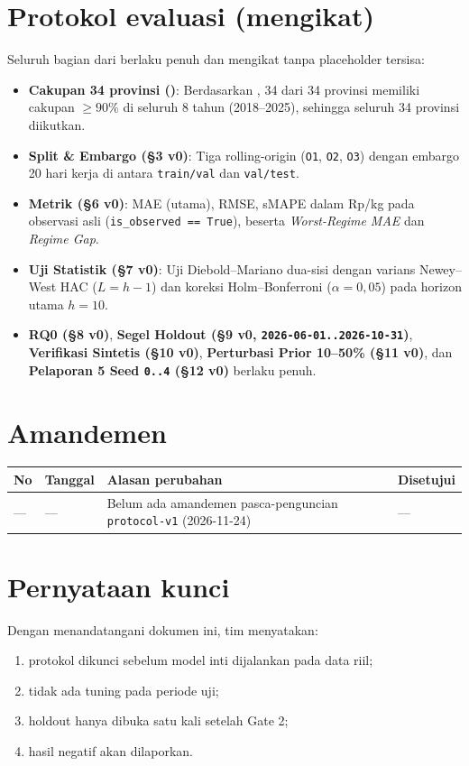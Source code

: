 \documentclass[11pt,a4paper]{article}
\begin{document}
\section{Protokol evaluasi (mengikat)}
Seluruh bagian dari  berlaku penuh dan mengikat tanpa placeholder tersisa:
\begin{itemize}
  \item \textbf{Cakupan 34 provinsi ()}: Berdasarkan , 34 dari 34 provinsi memiliki cakupan $\ge 90\%$ di seluruh 8 tahun (2018--2025), sehingga seluruh 34 provinsi diikutkan.
  \item \textbf{Split \& Embargo (\S3 v0)}: Tiga rolling-origin (\texttt{O1}, \texttt{O2}, \texttt{O3}) dengan embargo 20 hari kerja di antara \texttt{train/val} dan \texttt{val/test}.
  \item \textbf{Metrik (\S6 v0)}: MAE (utama), RMSE, sMAPE dalam Rp/kg pada observasi asli (\texttt{is\_observed == True}), beserta \emph{Worst-Regime MAE} dan \emph{Regime Gap}.
  \item \textbf{Uji Statistik (\S7 v0)}: Uji Diebold--Mariano dua-sisi dengan varians Newey--West HAC ($L = h - 1$) dan koreksi Holm--Bonferroni ($\alpha = 0{,}05$) pada horizon utama $h = 10$.
  \item \textbf{RQ0 (\S8 v0)}, \textbf{Segel Holdout (\S9 v0, \texttt{2026-06-01..2026-10-31})}, \textbf{Verifikasi Sintetis (\S10 v0)}, \textbf{Perturbasi Prior 10--50\% (\S11 v0)}, dan \textbf{Pelaporan 5 Seed \texttt{0..4} (\S12 v0)} berlaku penuh.
\end{itemize}

\section{Amandemen}
\begin{table}[H]
\centering
\small
\begin{tabular}{@{}C{1.2cm}L{2.6cm}L{6.4cm}L{4.0cm}@{}}
\toprule
No & Tanggal & Alasan perubahan & Disetujui \\
\midrule
--- & --- & Belum ada amandemen pasca-penguncian \texttt{protocol-v1} (2026-11-24) & --- \\
\bottomrule
\end{tabular}
\end{table}

\section{Pernyataan kunci}
Dengan menandatangani dokumen ini, tim menyatakan:
\begin{enumerate}
  \item protokol dikunci sebelum model inti dijalankan pada data riil;
  \item tidak ada tuning pada periode uji;
  \item holdout hanya dibuka satu kali setelah Gate 2;
  \item hasil negatif akan dilaporkan.
\end{enumerate}
\end{document}
